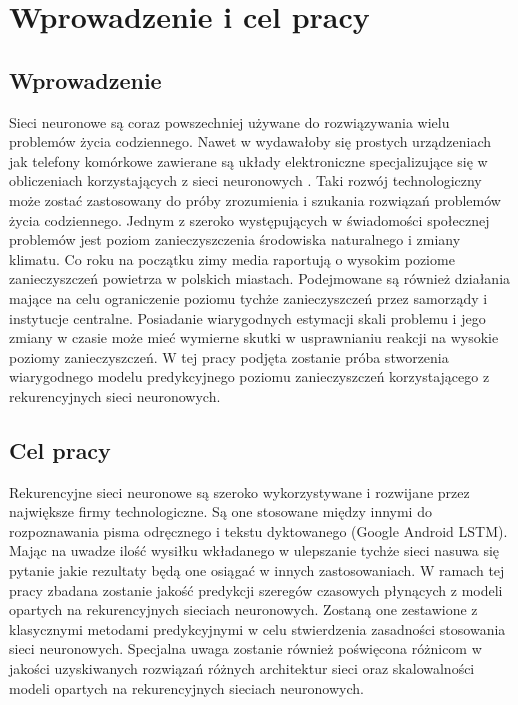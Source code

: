 \documentclass[10pt,a4paper]{article}
\begin{document}
\newpage
{}
\tableofcontents
\newpage

\section{Wprowadzenie i cel pracy}

\subsection{Wprowadzenie}
Sieci neuronowe są coraz powszechniej używane do rozwiązywania wielu problemów życia codziennego. Nawet w wydawałoby się prostych urządzeniach jak telefony komórkowe zawierane są układy elektroniczne specjalizujące się w obliczeniach korzystających z sieci neuronowych \cite{appleNeuralEngine}. Taki rozwój technologiczny może zostać zastosowany do próby zrozumienia i szukania rozwiązań problemów życia codziennego. Jednym z szeroko występujących w świadomości społecznej problemów jest poziom zanieczyszczenia środowiska naturalnego i zmiany klimatu. Co roku na początku zimy media raportują o wysokim poziome zanieczyszczeń powietrza w polskich miastach. Podejmowane są również działania mające na celu ograniczenie poziomu tychże zanieczyszczeń przez samorządy i instytucje centralne. Posiadanie wiarygodnych estymacji skali problemu i jego zmiany w czasie może mieć wymierne skutki w usprawnianiu reakcji na wysokie poziomy zanieczyszczeń. W tej pracy podjęta zostanie próba stworzenia wiarygodnego modelu predykcyjnego poziomu zanieczyszczeń korzystającego z rekurencyjnych sieci neuronowych.

\subsection{Cel pracy}
Rekurencyjne sieci neuronowe są szeroko wykorzystywane i rozwijane przez największe firmy technologiczne. Są one stosowane między innymi do rozpoznawania pisma odręcznego i tekstu dyktowanego (Google Android LSTM). Mając na uwadze ilość wysiłku wkładanego w ulepszanie tychże sieci nasuwa się pytanie jakie rezultaty będą one osiągać w innych zastosowaniach. W ramach tej pracy zbadana zostanie jakość predykcji szeregów czasowych płynących z modeli opartych na rekurencyjnych sieciach neuronowych. Zostaną one zestawione z klasycznymi metodami predykcyjnymi w celu stwierdzenia zasadności stosowania sieci neuronowych. Specjalna uwaga zostanie również poświęcona różnicom w jakości uzyskiwanych rozwiązań różnych architektur sieci oraz skalowalności modeli opartych na rekurencyjnych sieciach neuronowych. 
\end{document}
